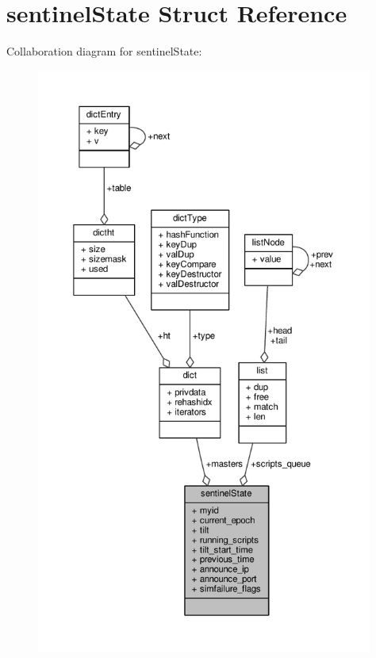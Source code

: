 \hypertarget{structsentinelState}{}\section{sentinel\+State Struct Reference}
\label{structsentinelState}


Collaboration diagram for sentinel\+State\+:\nopagebreak
\begin{figure}[H]
\begin{center}
\leavevmode
\includegraphics[height=550pt]{structsentinelState__coll__graph}
\end{center}
\end{figure}
